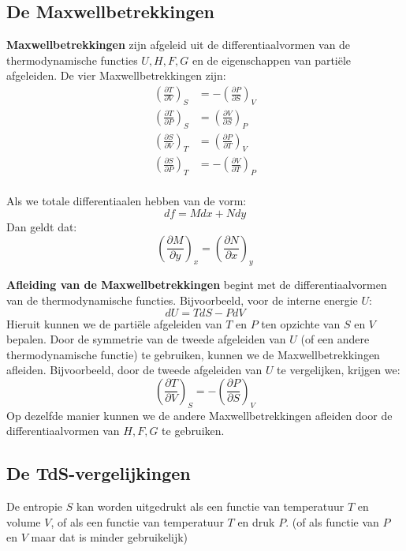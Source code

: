 \subsection{De Maxwellbetrekkingen}
\begin{derivation}
\textbf{Maxwellbetrekkingen} zijn afgeleid uit de differentiaalvormen van de thermodynamische functies \(U, H, F, G\) en de eigenschappen van partiële afgeleiden. De vier Maxwellbetrekkingen zijn:
\begin{align*}
\left(\frac{\partial T}{\partial V}\right)_S &= -\left(\frac{\partial P}{\partial S}\right)_V \\
\left(\frac{\partial T}{\partial P}\right)_S &= \left(\frac{\partial V}{\partial S}\right)_P \\
\left(\frac{\partial S}{\partial V}\right)_T &= \left(\frac{\partial P}{\partial T}\right)_V \\
\left(\frac{\partial S}{\partial P}\right)_T &= -\left(\frac{\partial V}{\partial T}\right)_P \\
\end{align*}
\end{derivation}
Als we totale differentiaalen hebben van de vorm:
\[df = Mdx + Ndy\]
Dan geldt dat:
\[\left(\frac{\partial M}{\partial y}\right)_x = \left(\frac{\partial N}{\partial x}\right)_y\]
\begin{derivation}
\textbf{Afleiding van de Maxwellbetrekkingen} begint met de differentiaalvormen van de thermodynamische functies. Bijvoorbeeld, voor de interne energie \(U\):
\[
dU = TdS - PdV
\]
Hieruit kunnen we de partiële afgeleiden van \(T\) en \(P\) ten opzichte van \(S\) en \(V\) bepalen. Door de symmetrie van de tweede afgeleiden van \(U\) (of een andere thermodynamische functie) te gebruiken, kunnen we de Maxwellbetrekkingen afleiden. Bijvoorbeeld, door de tweede afgeleiden van \(U\) te vergelijken, krijgen we:
\[\left(\frac{\partial T}{\partial V}\right)_S = -\left(\frac{\partial P}{\partial S}\right)_V\]
Op dezelfde manier kunnen we de andere Maxwellbetrekkingen afleiden door de differentiaalvormen van \(H, F, G\) te gebruiken.
\end{derivation}
\subsection{De TdS-vergelijkingen}


De entropie \(S\) kan worden uitgedrukt als een functie van temperatuur \(T\) en volume \(V\), of als een functie van temperatuur \(T\) en druk \(P\). (of als functie van \(P\) en \(V\) maar dat is minder gebruikelijk)

